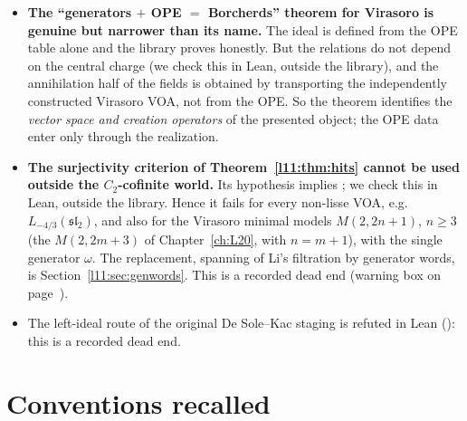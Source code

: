 \begin{itemize}
  unrelated to the presentation.
\item \textbf{The ``generators $+$ OPE $=$ Borcherds'' theorem for Virasoro is genuine but
  narrower than its name.} The ideal  is defined from the OPE table alone and the
  library proves  honestly. But the relations do not depend on the
  central charge (we check this in Lean, outside the library), and the
  annihilation half of the fields is obtained by transporting the independently constructed
  Virasoro VOA, not from the OPE. So the theorem identifies the \emph{vector space and creation
  operators} of the presented object; the OPE data enter only through the realization.
\item \textbf{The  surjectivity criterion of Theorem~\ref{l11:thm:hits} cannot be used outside the
  $C_2$-cofinite world.} Its hypothesis implies ; we check this in Lean, outside the library. Hence
  it fails for every non-lisse VOA, e.g.\ $L_{-4/3}(\mathfrak{sl}_2)$, and also for the Virasoro minimal models
  $M(2,2n+1)$, $n\ge3$ (the $M(2,2m+3)$ of Chapter~\ref{ch:L20}, with $n=m+1$), with the single generator $\omega$. The
  replacement, spanning of Li's filtration by generator words,
  is Section~\ref{l11:sec:genwords}. This is a recorded dead end (warning box on page~\pageref{l11:warn:hdec}).
\item The left-ideal route  of the original De Sole--Kac staging is refuted in Lean
  (\allowbreak{}\allowbreak{}\allowbreak{}\allowbreak{}): this is a recorded dead end.
\end{itemize}

\section{Conventions recalled}\label{l11:sec:conv}

